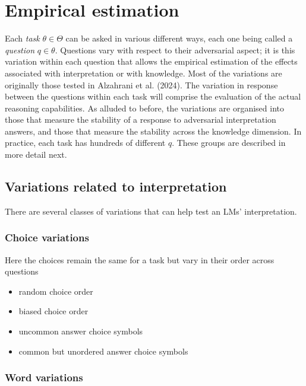 \documentclass[
]{article}
\begin{document}
\section{Empirical estimation}\label{empirical-estimation}

Each \emph{task} \(\theta \in \Theta\) can be asked in various different
ways, each one being called a \emph{question} \(q \in \theta\).
Questions vary with respect to their adversarial aspect; it is this
variation within each question that allows the empirical estimation of
the effects associated with interpretation or with knowledge. Most of
the variations are originally those tested in Alzahrani et al. (2024).
The variation in response between the questions within each task will
comprise the evaluation of the actual reasoning capabilities. As alluded
to before, the variations are organised into those that measure the
stability of a response to adversarial interpretation answers, and those
that measure the stability across the knowledge dimension. In practice,
each task has hundreds of different \(q\). These groups are described in
more detail next.

\subsection{Variations related to
interpretation}\label{variations-related-to-interpretation}

There are several classes of variations that can help test an LMs'
interpretation.

\subsubsection{Choice variations}\label{choice-variations}

Here the choices remain the same for a task but vary in their order
across questions

\begin{itemize}
\item
  random choice order
\item
  biased choice order
\item
  uncommon answer choice symbols
\item
  common but unordered answer choice symbols
\end{itemize}

\subsubsection{Word variations}\label{word-variations}
\end{document}

